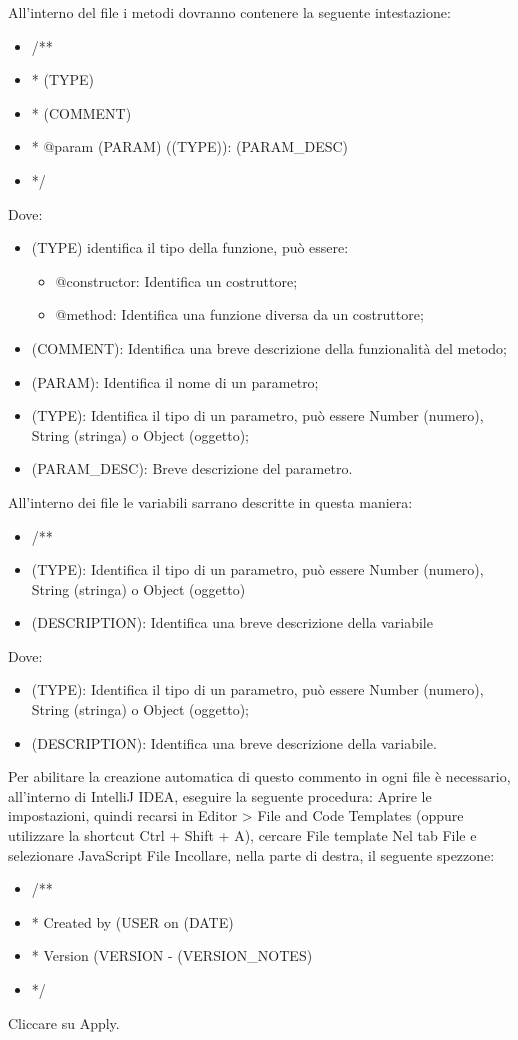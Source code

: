 All'interno del file i metodi dovranno contenere la seguente intestazione:
\begin{itemize}
\color{ForestGreen}
\item /**
\item * (TYPE)
\item * (COMMENT)
\item  * @param (PARAM) ((TYPE)): (PARAM\_DESC)
\item */
\end{itemize}
Dove:
\begin{itemize}
\item (TYPE) identifica il tipo della funzione, può essere:
\begin {itemize}
\item @constructor: Identifica un costruttore;
\item @method: Identifica una funzione diversa da un costruttore;
\end{itemize}
\item (COMMENT): Identifica una breve descrizione della funzionalità del metodo;
\item (PARAM): Identifica il nome di un parametro;
\item (TYPE): Identifica il tipo di un parametro, può essere Number (numero), String (stringa) o Object (oggetto);
\item (PARAM\_DESC): Breve descrizione del parametro.
\end{itemize}

All'interno dei file le variabili sarrano descritte in questa maniera:

\begin{itemize}
\color{ForestGreen}
\item /**
\item (TYPE): Identifica il tipo di un parametro, può essere Number (numero), String (stringa) o Object (oggetto)
\item (DESCRIPTION): Identifica una breve descrizione della variabile
\end{itemize}
Dove:
\begin{itemize}
\item (TYPE): Identifica il tipo di un parametro, può essere Number (numero), String (stringa) o Object (oggetto);
\item (DESCRIPTION): Identifica una breve descrizione della variabile.
\end{itemize}


Per abilitare la creazione automatica di questo commento in ogni file è necessario, all'interno di IntelliJ IDEA, eseguire la seguente procedura:
Aprire le impostazioni, quindi recarsi in Editor > File and Code Templates (oppure  utilizzare la shortcut Ctrl + Shift + A), cercare File template
Nel tab File e selezionare JavaScript File
Incollare, nella parte di destra, il seguente spezzone:
\begin{itemize}
\item /**
\item * Created by (USER on (DATE)
\item * Version (VERSION - (VERSION\_NOTES)
\item */
\end{itemize}
Cliccare su Apply.

